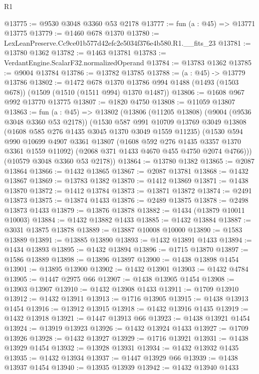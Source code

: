 \begin{lexlean}{R1}
\begin{coremodule}
@13775 := @9530 @3048 @3360 @53 @2178
@13777 := fun (a : @45) => @13771 @13775
@13779 := @1460 @678 @1370
@13780 := LexLeanPreserve.Cc9ce01b577d42efc2e5034f376e4b580.R1.__fits_23
@13781 := @13780 @1362
@13782 := @1463 @13781
@13783 := VerdantEngine.ScalarF32.normalizedOperand
@13784 := @13783 @1362
@13785 := @9004 @13784
@13786 := @13782 @13785
@13788 := (a : @45) -> @13779 @13786
@13802 := @1472
    @678
    @1370
    @13786
    @994
    @1488
    (@1493 (@1503 @678))
    (@1509 (@1510 (@1511 @994) @1370 @1487))
@13806 := @1608 @967 @992 @13770 @13775
@13807 := @1820 @4750
@13808 := @11059 @13807
@13863 := fun (a : @45) =>
  @13802
    (@13806
      (@11205 @13808)
      (@9004 (@9536 @3048 @3360 @53 @2178))
      (@1530
        @587
        @991
        @10709
        @13769
        @3049
        @13808
        (@1608 @585 @276 @1435 @3045 @1370 @3049 @1559 @11235)
        (@1530
          @594
          @990
          @10699
          @4907
          @3361
          @13807
          (@1608 @592 @276 @1435 @3357 @1370 @3361 @1559 @11092)
          (@2068 @371 @1433 @4670 @455 @4750 @2074 @4766)))
      (@10579 @3048 @3360 @53 @2178))
@13864 := @13780 @1382
@13865 := @2087 @13864
@13866 := @1432 @13865
@13867 := @2087 @13781
@13868 := @1432 @13867
@13869 := @13783 @1382
@13870 := @1412 @13869
@13871 := @1438 @13870
@13872 := @1412 @13784
@13873 := @13871 @13872
@13874 := @2491 @13873
@13875 := @13874 @1433
@13876 := @2489 @13875
@13878 := @2498 @13873 @1433
@13879 := @13876 @13878
@13882 := @1434 (@13879 @10011 @10003)
@13884 := @1432 @13882 @1433
@13885 := @1432 @13884
@13887 := @3031 @13875 @13878
@13889 := @13887 @10008 @10000
@13890 := @1583 @13889
@13891 := @13885 @13890
@13893 := @1432 @13891 @1433
@13894 := @1434 @13893
@13895 := @1432 @13894
@13896 := @1715 @13870
@13897 := @1586 @13889
@13898 := @13896 @13897
@13900 := @1438 @13898 @1454
@13901 := @13895 @13900
@13902 := @1432 @13901
@13903 := @1432 @4784
@13905 := @1447 @2975 @66
@13907 := @1438 @13905 @1454
@13908 := @13903 @13907
@13910 := @1432 @13908 @1433
@13911 := @1709 @13910
@13912 := @1432 @13911
@13913 := @1716 @13905
@13915 := @1438 @13913 @1454
@13916 := @13912 @13915
@13918 := @1432 @13916 @1435
@13919 := @1432 @13918
@13921 := @1447 @13913 @66
@13923 := @1438 @13921 @1454
@13924 := @13919 @13923
@13926 := @1432 @13924 @1433
@13927 := @1709 @13926
@13928 := @1432 @13927
@13929 := @1716 @13921
@13931 := @1438 @13929 @1454
@13932 := @13928 @13931
@13934 := @1432 @13932 @1435
@13935 := @1432 @13934
@13937 := @1447 @13929 @66
@13939 := @1438 @13937 @1454
@13940 := @13935 @13939
@13942 := @1432 @13940 @1433

\end{coremodule}
\end{lexlean}
